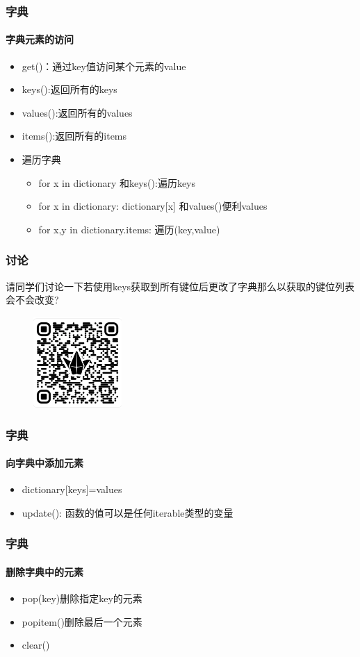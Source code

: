 \documentclass{beamer}
\begin{document}
\begin{frame}[t]
	\frametitle{字典}
	\framesubtitle{字典元素的访问}
	\begin{itemize}
		\item get()：通过key值访问某个元素的value
		\item keys():返回所有的keys
		\item values():返回所有的values
		\item items():返回所有的items
		\item 遍历字典
		      \begin{itemize}
			      \item for x in dictionary 和keys():遍历keys
			      \item for x in dictionary: dictionary[x] 和values()便利values
			      \item for x,y in dictionary.items: 遍历(key,value)
		      \end{itemize}

	\end{itemize}


\end{frame}
\begin{frame}[t]
	\frametitle{讨论}
	请同学们讨论一下若使用keys获取到所有键位后更改了字典那么以获取的键位列表会不会改变?

	\begin{figure}[htpb]
		\centering
		\includegraphics[width=0.3\textwidth]{discussion1.png}
		\label{fig:}
	\end{figure}
\end{frame}
\begin{frame}[t]
	\frametitle{字典}
	\framesubtitle{向字典中添加元素}
	\begin{itemize}
		\item dictionary[keys]=values
		\item update(): 函数的值可以是任何iterable类型的变量
	\end{itemize}

\end{frame}
\begin{frame}[t]
	\frametitle{字典}
	\framesubtitle{删除字典中的元素}
	\begin{itemize}
		\item pop(key)删除指定key的元素
		\item popitem()删除最后一个元素
		\item clear()
	\end{itemize}
\end{frame}
\end{document}
